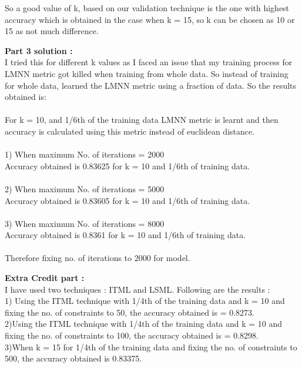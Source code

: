 \documentclass[a4paper,11pt]{article}
\begin{document}
\begin{mlsolution}
So a good value of k, based on our validation technique is the one with highest accuracy which is obtained in the case when k = 15, so k can be chosen as 10 or 15 as not much difference.

\newpage

\textbf{Part 3 solution :}\\

I tried this for different k values as I faced an issue that my training process for LMNN metric got killed when training from whole data. So instead of training for whole data, learned the LMNN metric using a fraction of data. So the results obtained is:\\\\For k = 10, and 1/6th of the training data LMNN metric is learnt and then accuracy is calculated using this metric instead of euclidean distance.\\\\1) When maximum No. of iterations = 2000\\Accuracy obtained is 0.83625 for k = 10 and 1/6th of training data.\\\\2) When maximum No. of iterations = 5000\\Accuracy obtained is 0.83605 for k = 10 and 1/6th of training data.\\\\3) When maximum No. of iterations = 8000\\Accuracy obtained is 0.8361 for k = 10 and 1/6th of training data.\\\\Therefore fixing no. of iterations to 2000 for model.
\newpage 

\textbf{Extra Credit part :}\\

I have used two techniques : ITML and LSML. Following are the results : \\

1) Using the ITML technique with 1/4th of the training data and k = 10 and fixing the no. of constraints to 50, the accuracy obtained is = 0.8273.\\

2)Using the ITML technique with 1/4th of the training data and k = 10 and fixing the no. of constraints to 100, the accuracy obtained is = 0.8298.\\

3)When k = 15 for 1/4th of the training data and fixing the no. of constraints to 500, the accuracy obtained is 0.83375. \\


\end{mlsolution}
\end{document}
